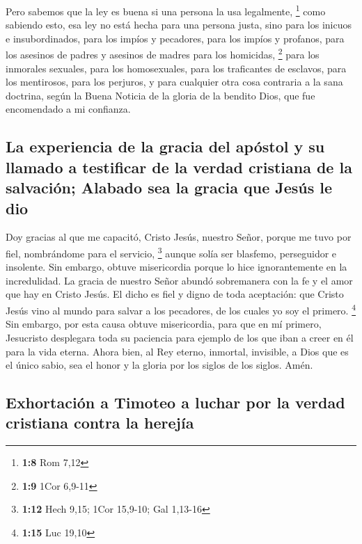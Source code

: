  Pero sabemos que la ley es buena si una persona la usa
legalmente, \footnote{\textbf{1:8} Rom 7,12}  como
sabiendo esto, esa ley no está hecha para una persona justa, sino para
los inicuos e insubordinados, para los impíos y pecadores, para los
impíos y profanos, para los asesinos de padres y asesinos de madres para
los homicidas, \footnote{\textbf{1:9} 1Cor 6,9-11}  para
los inmorales sexuales, para los homosexuales, para los traficantes de
esclavos, para los mentirosos, para los perjuros, y para cualquier otra
cosa contraria a la sana doctrina,  según la Buena
Noticia de la gloria de la bendito Dios, que fue encomendado a mi
confianza.

\hypertarget{la-experiencia-de-la-gracia-del-apuxf3stol-y-su-llamado-a-testificar-de-la-verdad-cristiana-de-la-salvaciuxf3n-alabado-sea-la-gracia-que-jesuxfas-le-dio}{%
\subsection{La experiencia de la gracia del apóstol y su llamado a
testificar de la verdad cristiana de la salvación; Alabado sea la gracia
que Jesús le
dio}\label{la-experiencia-de-la-gracia-del-apuxf3stol-y-su-llamado-a-testificar-de-la-verdad-cristiana-de-la-salvaciuxf3n-alabado-sea-la-gracia-que-jesuxfas-le-dio}}

 Doy gracias al que me capacitó, Cristo Jesús, nuestro
Señor, porque me tuvo por fiel, nombrándome para el servicio,
\footnote{\textbf{1:12} Hech 9,15; 1Cor 15,9-10; Gal 1,13-16}
 aunque solía ser blasfemo, perseguidor e insolente. Sin
embargo, obtuve misericordia porque lo hice ignorantemente en la
incredulidad.  La gracia de nuestro Señor abundó
sobremanera con la fe y el amor que hay en Cristo Jesús. 
El dicho es fiel y digno de toda aceptación: que Cristo Jesús vino al
mundo para salvar a los pecadores, de los cuales yo soy el primero.
\footnote{\textbf{1:15} Luc 19,10}  Sin embargo, por esta
causa obtuve misericordia, para que en mí primero, Jesucristo desplegara
toda su paciencia para ejemplo de los que iban a creer en él para la
vida eterna.  Ahora bien, al Rey eterno, inmortal,
invisible, a Dios que es el único sabio, sea el honor y la gloria por
los siglos de los siglos. Amén.

\hypertarget{exhortaciuxf3n-a-timoteo-a-luchar-por-la-verdad-cristiana-contra-la-herejuxeda}{%
\subsection{Exhortación a Timoteo a luchar por la verdad cristiana
contra la
herejía}\label{exhortaciuxf3n-a-timoteo-a-luchar-por-la-verdad-cristiana-contra-la-herejuxeda}}


